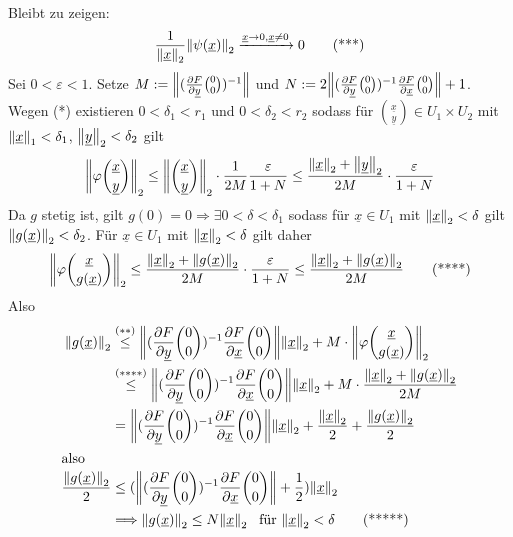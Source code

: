 Bleibt zu zeigen: 
\[
	\frac{1}{\norm[2]{\underline{x}} } \norm[2]{\psi(\underline{x})} \xrightarrow{\underline{x} \to 0, \underline{x} \not=0} 0  \tag{***}
\]
Sei $0 < \varepsilon<1$. Setze $M:= \norm{\enbrace{\diff{F}{\underline{y}} \binom{0}{0}}^{-1}}$ und 
$N:= 2 \norm{\enbrace{\diff{F}{\underline{y}} \binom{0}{0}}^{-1} \diff{F}{\underline{x}} \binom{0}{0}} + 1$.\\
Wegen (*) existieren $0< \delta_1 < r_1$ und $0< \delta_2 < r_2$ sodass für $\binom{\underline{x}}{\underline{y}} \in U_1 \times U_2$ mit 
$\norm[1]{\underline{x}} < \delta_1  $, $\norm[2]{\underline{y}} < \delta_2 $ gilt
\begin{align*}
	\norm[2]{\varphi \binom{\underline{x}}{\underline{y}}} \le \norm[2]{\binom{\underline{x}}{\underline{y}}} \cdot \frac{1}{2 M} \frac{\varepsilon}{1+N}   \le
	\frac{\norm[2]{\underline{x}} + \norm[2]{\underline{y}}  }{2 M} \cdot \frac{\varepsilon}{1+N}  
\end{align*}
Da $g$ stetig ist, gilt $g(0) = 0 \Rightarrow \exists 0 < \delta < \delta_1$ sodass für $\underline{x} \in U_1$ mit $\norm[2]{\underline{x}} < \delta  $ gilt
$\norm[2]{g(\underline{x})} < \delta_2 $. Für $\underline{x} \in U_1$ mit $\norm[2]{\underline{x}} < \delta  $ gilt daher 
\[
	\norm[2]{\varphi \binom{\underline{x}}{g(\underline{x})}} \le \frac{\norm[2]{\underline{x}} + \norm[2]{g(\underline{x})}  }{2 M} \cdot \frac{\varepsilon}{1+N}
	\le  \frac{\norm[2]{\underline{x}} + \norm[2]{g(\underline{x})}  }{2M} \tag{****} 
\]
Also
\begin{align*}
	\norm[2]{g(\underline{x})} &\stackrel{(**)}{\le} \norm{ \enbrace{ \diff{F}{\underline{y}} \binom{0}{0}  }^{-1}  \diff{F}{\underline{x}} \binom{0}{0} } \norm[2]{\underline{x}} +
	M \cdot \norm[2]{\varphi \binom{\underline{x}}{g(\underline{x})}} \\  &\stackrel{(****)}{\le}  
	\norm{ \enbrace{ \diff{F}{\underline{y}} \binom{0}{0}  }^{-1}  \diff{F}{\underline{x}} \binom{0}{0} } \norm[2]{\underline{x}} + M \cdot \frac{\norm[2]{\underline{x}} + \norm[2]{g(\underline{x})}  }{2M}  \\
	&=  \norm{ \enbrace{ \diff{F}{\underline{y}} \binom{0}{0}  }^{-1}  \diff{F}{\underline{x}} \binom{0}{0} } \norm[2]{\underline{x}} + \frac{\norm[2]{\underline{x}} }{2}
	+ \frac{\norm[2]{g(\underline{x})} }{2}  \\
	\intertext{also}
	\frac{\norm[2]{g(\underline{x})} }{2} &\le\enbrace{\norm{ \enbrace{ \diff{F}{\underline{y}} \binom{0}{0}  }^{-1}  \diff{F}{\underline{x}} \binom{0}{0} } + \frac{1}{2}}
	\norm[2]{\underline{x}}  \\
	&\Longrightarrow \norm[2]{g(\underline{x})} \le N \norm[2]{\underline{x}} \enspace  \text{ für $\norm[2]{\underline{x}} < \delta  $} \tag{*****}
\end{align*}
